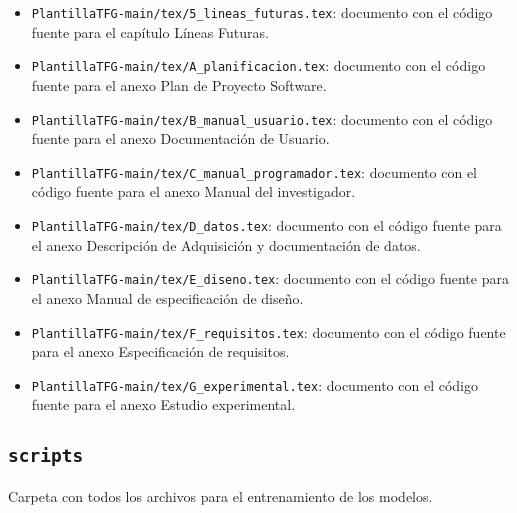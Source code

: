 \begin{itemize}
\begin{itemize}
\begin{itemize}
        \item \texttt{PlantillaTFG-main/tex/5\_lineas\_futuras.tex}: documento con el código fuente para el capítulo Líneas Futuras.
        \item \texttt{PlantillaTFG-main/tex/A\_planificacion.tex}: documento con el código fuente para el anexo Plan de Proyecto Software.
        \item \texttt{PlantillaTFG-main/tex/B\_manual\_usuario.tex}: documento con el código fuente para el anexo Documentación de Usuario.
        \item \texttt{PlantillaTFG-main/tex/C\_manual\_programador.tex}: documento con el código fuente para el anexo Manual del investigador.
        \item \texttt{PlantillaTFG-main/tex/D\_datos.tex}: documento con el código fuente para el anexo Descripción de Adquisición y documentación de datos.
        \item \texttt{PlantillaTFG-main/tex/E\_diseno.tex}: documento con el código fuente para el anexo Manual de especificación de diseño.
        \item \texttt{PlantillaTFG-main/tex/F\_requisitos.tex}: documento con el código fuente para el anexo Especificación de requisitos.
        \item \texttt{PlantillaTFG-main/tex/G\_experimental.tex}: documento con el código fuente para el anexo Estudio experimental.
    \end{itemize}
\end{itemize}

\subsection{\texttt{scripts}}

Carpeta con todos los archivos para el entrenamiento de los modelos.


\end{itemize}
